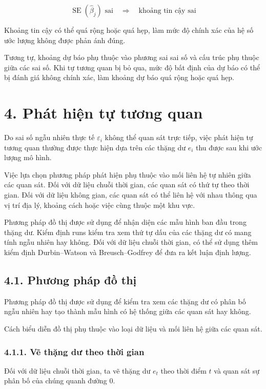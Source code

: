 \documentclass[12pt,a4paper]{article}
\begin{document}
\[
\operatorname{SE}(\hat{\beta}_j)
\text{ sai}
\quad \Rightarrow \quad
\text{khoảng tin cậy sai}
\]

Khoảng tin cậy có thể quá rộng hoặc quá hẹp, làm mức độ chính xác của hệ số ước lượng không được phản ánh đúng.

Tương tự, khoảng dự báo phụ thuộc vào phương sai sai số và cấu trúc phụ thuộc giữa các sai số. Khi tự tương quan bị bỏ qua, mức độ bất định của dự báo có thể bị đánh giá không chính xác, làm khoảng dự báo quá rộng hoặc quá hẹp.


\section{4. Phát hiện tự tương quan}

Do sai số ngẫu nhiên thực tế $\varepsilon_i$ không thể quan sát trực tiếp, việc phát hiện tự tương quan thường được thực hiện dựa trên các thặng dư $e_i$ thu được sau khi ước lượng mô hình.

Việc lựa chọn phương pháp phát hiện phụ thuộc vào mối liên hệ tự nhiên giữa các quan sát. Đối với dữ liệu chuỗi thời gian, các quan sát có thứ tự theo thời gian. Đối với dữ liệu không gian, các quan sát có thể liên hệ với nhau thông qua vị trí địa lý, khoảng cách hoặc việc cùng thuộc một khu vực.

Phương pháp đồ thị được sử dụng để nhận diện các mẫu hình ban đầu trong thặng dư. Kiểm định runs kiểm tra xem thứ tự dấu của các thặng dư có mang tính ngẫu nhiên hay không. Đối với dữ liệu chuỗi thời gian, có thể sử dụng thêm kiểm định Durbin--Watson và Breusch--Godfrey để đưa ra kết luận định lượng.


\subsection{4.1. Phương pháp đồ thị}

Phương pháp đồ thị được sử dụng để kiểm tra xem các thặng dư có phân bố ngẫu nhiên hay tạo thành mẫu hình có hệ thống giữa các quan sát hay không.

Cách biểu diễn đồ thị phụ thuộc vào loại dữ liệu và mối liên hệ giữa các quan sát.


\subsubsection{4.1.1. Vẽ thặng dư theo thời gian}

Đối với dữ liệu chuỗi thời gian, ta vẽ thặng dư $e_t$ theo thời điểm $t$ và quan sát sự phân bố của chúng quanh đường $0$.
\end{document}
